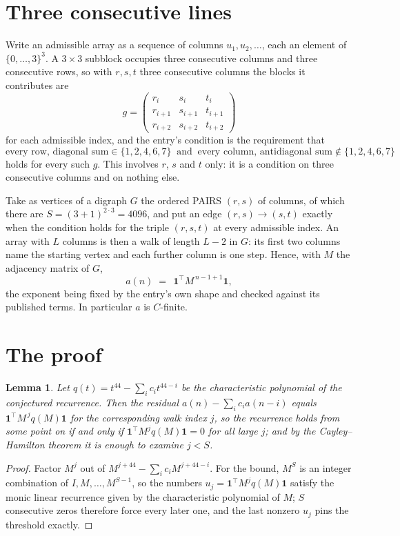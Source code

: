 \documentclass[11pt,a4paper]{article}
\theoremstyle{plain}
\newtheorem{lemma}[theorem]{Lemma}
\theoremstyle{definition}
\begin{document}
\section{Three consecutive lines}

Write an admissible array as a sequence of columns $u_1,u_2,\dots$, each an element of
$\{0,\dots,3\}^{3}$. A $3\times3$ subblock occupies three consecutive columns and
three consecutive rows, so with $r,s,t$ three consecutive columns the blocks it
contributes are
\[
g=\begin{pmatrix}r_i&s_i&t_i\\ r_{i+1}&s_{i+1}&t_{i+1}\\ r_{i+2}&s_{i+2}&t_{i+2}\end{pmatrix}
\]
for each admissible index, and the entry's condition is the requirement that
\[
\text{every row, diagonal sum} \in \{1,2,4,6,7\}\ \text{ and }\ \text{every column, antidiagonal sum} \notin \{1,2,4,6,7\}
\]
holds for every such $g$. This involves $r$, $s$ and $t$ only: it is a condition on
three consecutive columns and on nothing else.

Take as vertices of a digraph $G$ the ordered PAIRS $(r,s)$ of columns, of which there are
$S=(3+1)^{2\cdot3}=4096$, and put an edge $(r,s)\to(s,t)$ exactly when the condition
holds for the triple $(r,s,t)$ at every admissible index. An array with $L$ columns is then a
walk of length $L-2$ in $G$: its first two columns name the starting vertex and each further
column is one step. Hence, with $M$ the adjacency matrix of $G$,
\[
a(n)\;=\;\,\mathbf{1}^{\!\top}M^{\,n-1+1}\mathbf{1},
\]
the exponent being fixed by the entry's own shape and checked against its published terms.
In particular $a$ is $C$-finite.

\section{The proof}

\begin{lemma}\label{lem:crit}
Let $q(t)=t^{44}-\sum_i c_it^{44-i}$ be the characteristic polynomial of the
conjectured recurrence. Then the residual $a(n)-\sum_ic_ia(n-i)$ equals
$\mathbf{1}^{\!\top}M^{\,j}q(M)\mathbf{1}$ for the corresponding walk index
$j$, so the recurrence holds from some point on if and only if
$\mathbf{1}^{\!\top}M^{j}q(M)\mathbf{1}=0$ for all large $j$; and by the
Cayley--Hamilton theorem it is enough to examine $j<S$.
\end{lemma}

\begin{proof}
Factor $M^{j}$ out of $M^{j+44}-\sum_ic_iM^{j+44-i}$. For the bound, $M^{S}$
is an integer combination of $I,M,\dots,M^{S-1}$, so the numbers
$u_j=\mathbf{1}^{\!\top}M^{j}q(M)\mathbf{1}$ satisfy the monic linear recurrence given by
the characteristic polynomial of $M$; $S$ consecutive zeros therefore force every later one,
and the last nonzero $u_j$ pins the threshold exactly.
\end{proof}
\end{document}
